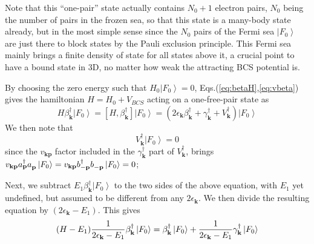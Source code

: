 \documentclass[epj]{svjour}
\newcommand{\vk}{\ensuremath{\mathbf{k}}}
\begin{document}
 Note that this ``one-pair'' state actually contains $N_0+1$ electron pairs, 
$N_0$ being the number of pairs in the frozen sea, so that this state is a many-body state already, but in the most simple sense since the $N_0$ pairs of the Fermi sea $%
\left|F_0\right> $ are just there to block states by the Pauli exclusion
principle. This Fermi sea mainly brings a finite density of state for all
states above it, a crucial point to have a bound state in 3D, no matter how weak the attracting BCS potential is.

By choosing the zero energy such
that $H_0\left|F_0\right> =0$, Eqs.(\ref{eq:betaH},\ref{eq:vbeta}) gives the hamiltonian $H=H_0+V_{BCS}$
acting on a one-free-pair state as 
\begin{equation}
H\beta^{\dagger}_\vk\left|F_0\right>  =\left[H,\beta^{\dagger}_\vk\right] 
\left|F_0\right> 
=\left(2\epsilon_\vk\beta^{\dagger}_\vk+\gamma^{\dagger}_\vk+V^{\dagger}_\vk%
\right) \left|F_0\right>  
\end{equation}
We then note that 
\begin{equation}\label{eq:Vk0}
V^{\dagger}_\vk\left|F_0\right> =0
\end{equation}
since the $v_{\mathbf{k} \mathbf{p} }$ factor included
in the $\gamma^{\dagger}_{\mathbf{k} }$ part of $V^{\dagger}_\vk$,  brings
 $v_{\mathbf{k} \mathbf{p} }a^{\dagger}_{\mathbf{p} }a^{}_{%
\mathbf{p} }\left|F_0\right>=v_{\mathbf{k} \mathbf{p} }b^{\dagger}_{-\mathbf{p} }b^{}_{-\mathbf{p} }\left|F_0\right>=0$;
 
Next, we subtract $E _1\beta^{\dagger}_\vk\left|F_0\right>  $ to
the two sides of the above equation, with $E_1$ yet undefined, but assumed to be different from any $2\epsilon_{\mathbf{k}}$.  We then divide the resulting equation by $%
\left(2\epsilon_\vk-E _1\right) $.  This gives
\begin{equation}  \label{eq:HE1}
 (H-E_1)\frac{1}{2\epsilon_\vk-E _1} \beta^{\dagger}_\vk%
\left|F_0\right>  =\beta^{\dagger}_\vk\left|F_0\right>  +\frac{1}{%
2\epsilon_\vk-E _1} \gamma^{\dagger}_\vk\left|F_0\right>  
\end{equation}
\end{document}
